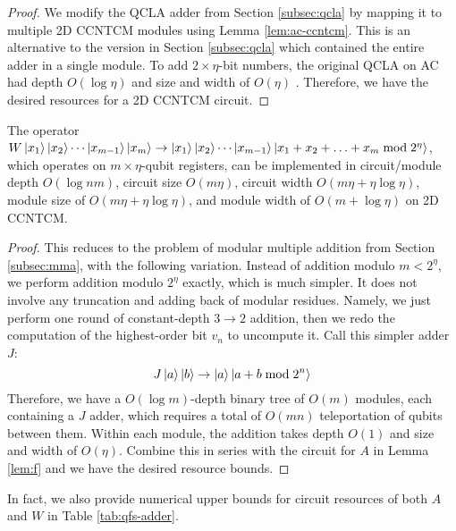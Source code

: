 \begin{proof}
We modify the QCLA adder from
Section \ref{subsec:qcla} by mapping it to multiple \textsf{2D CCNTCM} modules
using
Lemma \ref{lem:ac-ccntcm}.
This is an alternative to the version in Section \ref{subsec:qcla} which
contained the entire adder in a single module.
To add $2 \times \eta$-bit numbers, the original QCLA on \textsf{AC} had
depth $O(\log \eta)$ and size and width of $O(\eta)$ \cite{Draper2004}.
Therefore, we have the desired resources for a \textsf{2D CCNTCM} circuit.
\end{proof}

\begin{lemma}
The operator $W\left\vert{x_1}\right\rangle\left\vert{x_2}\right\rangle\cdots\left\vert{x_{m-1}}\right\rangle\left\vert{x_m}\right\rangle \rightarrow
\left\vert{x_1}\right\rangle\left\vert{x_2}\right\rangle\cdots\left\vert{x_{m-1}}\right\rangle\left\vert{x_1 + x_2 + \ldots + x_m \bmod 2^{\eta}}\right\rangle$,
which operates on $m \times \eta$-qubit registers, can be
implemented in circuit/module depth $O(\log nm)$, circuit size $O(m\eta)$, 
circuit width $O(m\eta + \eta\log \eta)$, module size of $O(m\eta + \eta \log \eta)$, and
module width of $O(m + \log \eta)$ on
\textsf{2D CCNTCM}.
\label{lem:w}
\end{lemma}

\begin{proof}
This reduces to the problem of modular multiple addition from
Section \ref{subsec:mma}, with the following variation. Instead of
addition modulo $m < 2^{\eta}$, we perform addition modulo $2^{\eta}$
exactly, which is
much simpler. It does not involve any truncation and adding back of
modular residues. Namely, we just perform one round of constant-depth
$3 \rightarrow 2$ addition, then we redo the computation of the
highest-order bit $v_n$ to uncompute it. Call this simpler
adder $J$:
%
\begin{equation}
J\left\vert{a}\right\rangle\left\vert{b}\right\rangle \rightarrow \left\vert{a}\right\rangle\left\vert{a+b \bmod 2^n}\right\rangle
\end{equation}
%
Therefore, we have a $O(\log m)$-depth binary tree of $O(m)$ modules,
each containing a $J$ adder,
which requires a total of $O(mn)$ teleportation of qubits between them.
Within each module, the addition takes depth $O(1)$ and size and width
of $O(\eta)$. Combine this in series with the circuit for $A$ in
Lemma \ref{lem:f} and we have the desired resource bounds.
\end{proof}

In fact, we also provide numerical upper bounds for circuit resources
of both $A$ and $W$ in Table \ref{tab:qfs-adder}.

